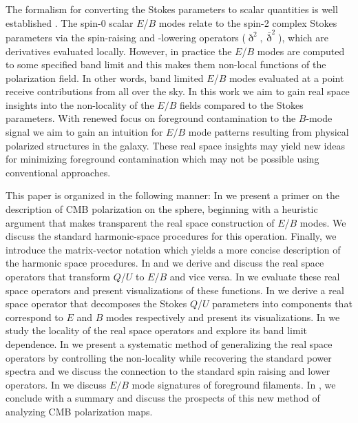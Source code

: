 The formalism for converting the Stokes parameters to scalar quantities is well established \citep{1997PhRvD..55.7368K,1997PhRvD..55.1830Z}. The spin-0 scalar $E$/$B$ modes relate to the spin-2 complex Stokes parameters via the spin-raising and -lowering operators ($\eth^2,\bar \eth^2$), which are derivatives evaluated locally.  However, in practice the $E$/$B$ modes are computed to some specified band limit and this makes them non-local functions of the polarization field.  In other words, band limited $E$/$B$ modes evaluated at a point receive contributions from all over the sky. In this work we aim to gain real space insights into the non-locality of the $E/B$ fields compared to the Stokes parameters. With renewed focus on foreground contamination to the $B$-mode signal we aim to gain an intuition for $E/B$ mode patterns resulting from physical polarized structures in the galaxy. These real space insights may yield new ideas for minimizing foreground contamination which may not be possible using conventional approaches. 


This paper is organized in the following manner: In  we present a primer on the description of CMB polarization on the sphere, beginning with a heuristic argument that makes transparent the real space construction of $E$/$B$ modes.  We discuss the standard harmonic-space procedures for this operation. Finally, we introduce the matrix-vector notation which yields a more concise description of the harmonic space procedures. In  and  we derive and discuss the real space operators that transform $Q$/$U$ to $E$/$B$ and vice versa. In  we evaluate these real space operators and present visualizations of these functions. In  we derive a real space operator that decomposes the Stokes $Q$/$U$  parameters into components that correspond to $E$ and $B$ modes respectively and present its visualizations.  In  we study the locality of the real space operators and explore its band limit dependence. In  we present a systematic method of generalizing the real space operators by controlling the non-locality while recovering the standard power spectra and we discuss the connection to the standard spin raising and lower operators. In  we discuss $E/B$ mode signatures of foreground filaments. In , we conclude with a summary and discuss the prospects of this new method of analyzing CMB polarization maps.

